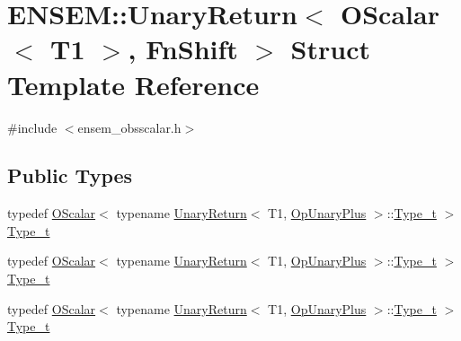 \hypertarget{structENSEM_1_1UnaryReturn_3_01OScalar_3_01T1_01_4_00_01FnShift_01_4}{}\section{E\+N\+S\+EM\+:\+:Unary\+Return$<$ O\+Scalar$<$ T1 $>$, Fn\+Shift $>$ Struct Template Reference}
\label{structENSEM_1_1UnaryReturn_3_01OScalar_3_01T1_01_4_00_01FnShift_01_4}


{\ttfamily \#include $<$ensem\+\_\+obsscalar.\+h$>$}

\subsection*{Public Types}
\begin{DoxyCompactItemize}
\item 
typedef \mbox{\hyperlink{classENSEM_1_1OScalar}{O\+Scalar}}$<$ typename \mbox{\hyperlink{structENSEM_1_1UnaryReturn}{Unary\+Return}}$<$ T1, \mbox{\hyperlink{structENSEM_1_1OpUnaryPlus}{Op\+Unary\+Plus}} $>$\+::\mbox{\hyperlink{structENSEM_1_1UnaryReturn_3_01OScalar_3_01T1_01_4_00_01FnShift_01_4_a800574635cdc9328aeda8a2f34cd559d}{Type\+\_\+t}} $>$ \mbox{\hyperlink{structENSEM_1_1UnaryReturn_3_01OScalar_3_01T1_01_4_00_01FnShift_01_4_a800574635cdc9328aeda8a2f34cd559d}{Type\+\_\+t}}
\item 
typedef \mbox{\hyperlink{classENSEM_1_1OScalar}{O\+Scalar}}$<$ typename \mbox{\hyperlink{structENSEM_1_1UnaryReturn}{Unary\+Return}}$<$ T1, \mbox{\hyperlink{structENSEM_1_1OpUnaryPlus}{Op\+Unary\+Plus}} $>$\+::\mbox{\hyperlink{structENSEM_1_1UnaryReturn_3_01OScalar_3_01T1_01_4_00_01FnShift_01_4_a800574635cdc9328aeda8a2f34cd559d}{Type\+\_\+t}} $>$ \mbox{\hyperlink{structENSEM_1_1UnaryReturn_3_01OScalar_3_01T1_01_4_00_01FnShift_01_4_a800574635cdc9328aeda8a2f34cd559d}{Type\+\_\+t}}
\item 
typedef \mbox{\hyperlink{classENSEM_1_1OScalar}{O\+Scalar}}$<$ typename \mbox{\hyperlink{structENSEM_1_1UnaryReturn}{Unary\+Return}}$<$ T1, \mbox{\hyperlink{structENSEM_1_1OpUnaryPlus}{Op\+Unary\+Plus}} $>$\+::\mbox{\hyperlink{structENSEM_1_1UnaryReturn_3_01OScalar_3_01T1_01_4_00_01FnShift_01_4_a800574635cdc9328aeda8a2f34cd559d}{Type\+\_\+t}} $>$ \mbox{\hyperlink{structENSEM_1_1UnaryReturn_3_01OScalar_3_01T1_01_4_00_01FnShift_01_4_a800574635cdc9328aeda8a2f34cd559d}{Type\+\_\+t}}
\end{DoxyCompactItemize}


